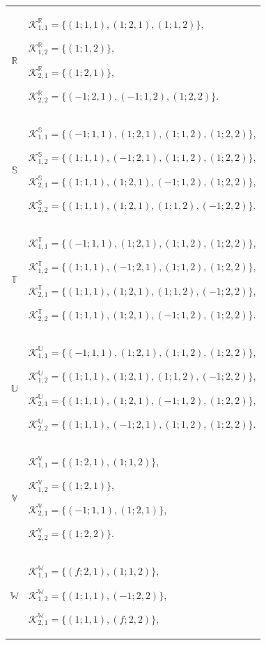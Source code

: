 \documentclass{amsart}
\theoremstyle{definition}
\theoremstyle{remark}
\numberwithin{equation}{section}
\begin{document}
\begin{center}
\begin{longtable}{c|p{}}
$\mathbb{R}$ &
$\mathscr{K}_{1,1}^{\mathbb{R}}=\{(1;1,1),(1;2,1),(1;1,2)\}$,

$\mathscr{K}_{1,2}^{\mathbb{R}}=\{(1;1,2)\}$,

$\mathscr{K}_{2,1}^{\mathbb{R}}=\{(1;2,1)\}$,

$\mathscr{K}_{2,2}^{\mathbb{R}}=\{(-1;2,1),(-1;1,2),(1;2,2)\}$.
\\

$\mathbb{S}$ &
$\mathscr{K}_{1,1}^{\mathbb{S}}=\{(-1;1,1),(1;2,1),(1;1,2),(1;2,2)\}$,

$\mathscr{K}_{1,2}^{\mathbb{S}}=\{(1;1,1),(-1;2,1),(1;1,2),(1;2,2)\}$,

$\mathscr{K}_{2,1}^{\mathbb{S}}=\{(1;1,1),(1;2,1),(-1;1,2),(1;2,2)\}$,

$\mathscr{K}_{2,2}^{\mathbb{S}}=\{(1;1,1),(1;2,1),(1;1,2),(-1;2,2)\}$.
\\

$\mathbb{T}$ &
$\mathscr{K}_{1,1}^{\mathbb{T}}=\{(-1;1,1),(1;2,1),(1;1,2),(1;2,2)\}$,

$\mathscr{K}_{1,2}^{\mathbb{T}}=\{(1;1,1),(-1;2,1),(1;1,2),(1;2,2)\}$,

$\mathscr{K}_{2,1}^{\mathbb{T}}=\{(1;1,1),(1;2,1),(1;1,2),(-1;2,2)\}$,

$\mathscr{K}_{2,2}^{\mathbb{T}}=\{(1;1,1),(1;2,1),(-1;1,2),(1;2,2)\}$.
\\

$\mathbb{U}$ &
$\mathscr{K}_{1,1}^{\mathbb{U}}=\{(-1;1,1),(1;2,1),(1;1,2),(1;2,2)\}$,

$\mathscr{K}_{1,2}^{\mathbb{U}}=\{(1;1,1),(1;2,1),(1;1,2),(-1;2,2)\}$,

$\mathscr{K}_{2,1}^{\mathbb{U}}=\{(1;1,1),(1;2,1),(-1;1,2),(1;2,2)\}$,

$\mathscr{K}_{2,2}^{\mathbb{U}}=\{(1;1,1),(-1;2,1),(1;1,2),(1;2,2)\}$.
\\

$\mathbb{V}$ &
$\mathscr{K}_{1,1}^{\mathbb{V}}=\{(1;2,1),(1;1,2)\}$,

$\mathscr{K}_{1,2}^{\mathbb{V}}=\{(1;2,1)\}$,

$\mathscr{K}_{2,1}^{\mathbb{V}}=\{(-1;1,1),(1;2,1)\}$,

$\mathscr{K}_{2,2}^{\mathbb{V}}=\{(1;2,2)\}$.
\\

$\mathbb{W}$ &
$\mathscr{K}_{1,1}^{\mathbb{W}}=\{(f;2,1),(1;1,2)\}$,

$\mathscr{K}_{1,2}^{\mathbb{W}}=\{(1;1,1),(-1;2,2)\}$,

$\mathscr{K}_{2,1}^{\mathbb{W}}=\{(1;1,1),(f;2,2)\}$,


\end{longtable}
\end{center}
\end{document}
